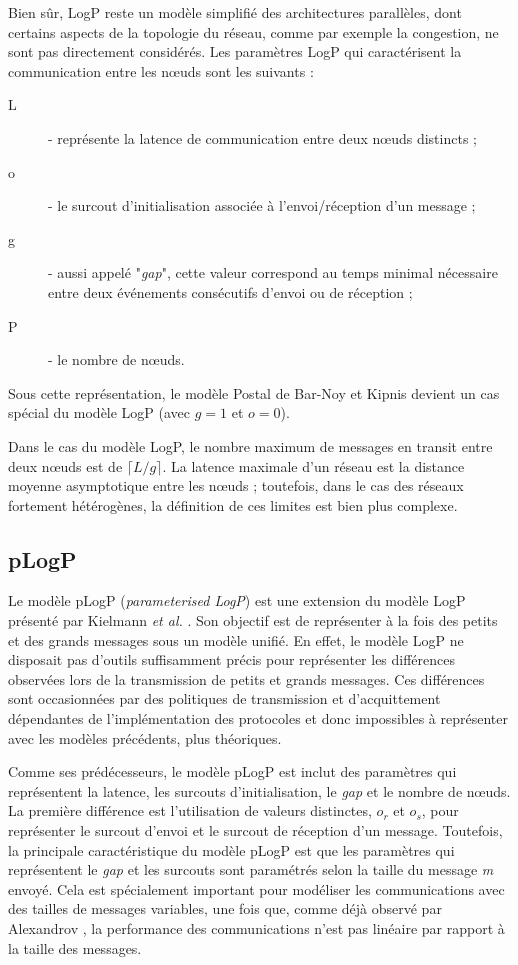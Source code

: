 Bien sûr, LogP reste un modèle simplifié des architectures parallèles,
dont certains aspects de la topologie du réseau, comme par exemple
la congestion, ne sont pas directement considérés. Les paramètres LogP qui caractérisent
la communication entre les n{\oe}uds sont les suivants : 

\begin{description}
\item [{L}] - représente la latence de communication entre deux n{\oe}uds
distincts ;
\item [{o}] - le surcout d'initialisation associée à l'envoi/réception
d'un message ;
\item [{g}] - aussi appelé "\textit{gap}", cette valeur correspond au temps minimal nécessaire entre deux événements consécutifs
d'envoi ou de réception ;
\item [{P}] - le nombre de n{\oe}uds.
\end{description}
Sous cette représentation, le modèle Postal de Bar-Noy et Kipnis devient
un cas spécial du modèle LogP (avec $g=1$ et $o=0$). 

Dans le cas du modèle LogP, le nombre maximum de messages en transit
entre deux n{\oe}uds est de $\lceil L/g\rceil$. La latence maximale
d'un réseau est la distance moyenne asymptotique entre les n{\oe}uds
; toutefois, dans le cas des réseaux fortement hétérogènes, la définition
de ces limites est bien plus complexe. 


\subsection*{pLogP}

Le modèle pLogP (\emph{parameterised LogP}) est une extension
du modèle LogP présenté par Kielmann \emph{et al.} \cite{Kielmann01}. Son objectif est de 
représenter à la fois des petits et des grands messages sous un modèle unifié. En effet, le modèle LogP ne disposait pas d'outils suffisamment précis pour représenter les différences observées lors de la transmission de petits et grands messages. Ces différences sont occasionnées par des politiques de transmission et d'acquittement dépendantes de l'implémentation des protocoles et donc impossibles à représenter avec les modèles précédents, plus théoriques.

Comme ses prédécesseurs, le modèle pLogP est inclut des
paramètres qui représentent la latence, les surcouts d'initialisation,
le \emph{gap} et le nombre de n{\oe}uds. La première différence est
l'utilisation de valeurs distinctes, $o_{r}$ et $o_{s}$, pour représenter
le surcout d'envoi et le surcout de réception d'un message. Toutefois,
la principale caractéristique du modèle pLogP est que les paramètres
qui représentent le \emph{gap} et les surcouts sont paramétrés selon
la taille du message \textit{m} envoyé. Cela est spécialement important pour
modéliser les communications avec des tailles de messages variables,
une fois que, comme déjà observé par Alexandrov \cite{Alexandrov95},
la performance des communications n'est pas linéaire par rapport à
la taille des messages.


